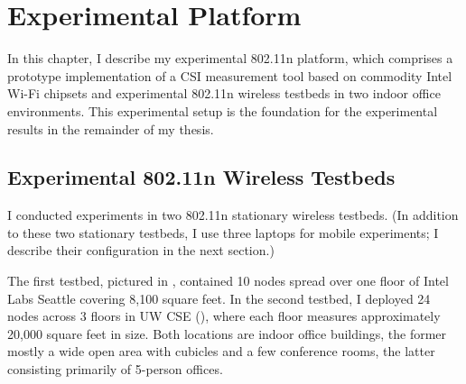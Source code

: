 \ifx\mainfile\undefined

\setcounter{chapter}{4} %
\fi

\cleardoublepage
\chapter{Experimental Platform}
\label{chap:tool}

In this chapter, I describe my experimental 802.11n platform, which comprises a prototype implementation of a CSI measurement tool based on commodity Intel Wi-Fi chipsets and experimental 802.11n wireless testbeds in two indoor office environments. This experimental setup is the foundation for the experimental results in the remainder of my thesis.

\section{Experimental 802.11n Wireless Testbeds}
I conducted experiments in two 802.11n stationary wireless testbeds. (In addition to these two stationary testbeds, I use three laptops for mobile experiments; I describe their configuration in the next section.)

The first testbed, pictured in , contained 10 nodes spread over one floor of Intel Labs Seattle covering 8,100 square feet. In the second testbed, I deployed 24 nodes across 3 floors in UW CSE (), where each floor measures approximately 20,000 square feet in size. Both locations are indoor office buildings, the former mostly a wide open area with cubicles and a few conference rooms, the latter consisting primarily of 5-person offices.

